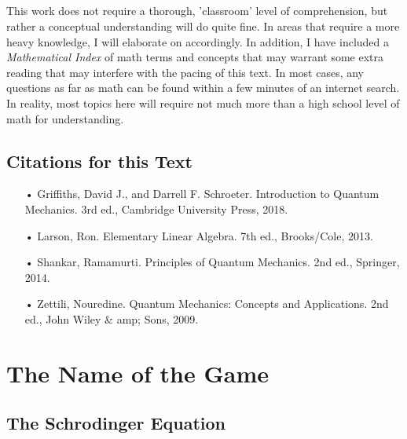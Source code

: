 \documentclass[12pt,letterpaper]{book}
\begin{document}
\paragraph*{}This work does not require a thorough, 'classroom' level of comprehension, but rather a conceptual understanding will do quite fine. In areas that require a more heavy knowledge, I will elaborate on accordingly. In addition, I have included a \textit{Mathematical Index} of math terms and concepts that may warrant some extra reading that may interfere with the pacing of this text. In most cases, any questions as far as math can be found within a few minutes of an internet search. In reality, most topics here will require not much more than a high school level of math for understanding. 

\pagebreak



\section*{Citations for this Text}
\begin{enumerate}
\item[•]Griffiths, David J., and Darrell F. Schroeter. Introduction to Quantum Mechanics. 3rd ed., Cambridge University Press, 2018.
\item[•]Larson, Ron. Elementary Linear Algebra. 7th ed., Brooks/Cole, 2013.
\item[•]Shankar, Ramamurti. Principles of Quantum Mechanics. 2nd ed., Springer, 2014.
\item[•]Zettili, Nouredine. Quantum Mechanics: Concepts and Applications. 2nd ed., John Wiley \& amp; Sons, 2009.
\end{enumerate}

\vspace{16cm}
\pagebreak


\chapter{The Name of the Game}


\section{The Schrodinger Equation}
\end{document}
